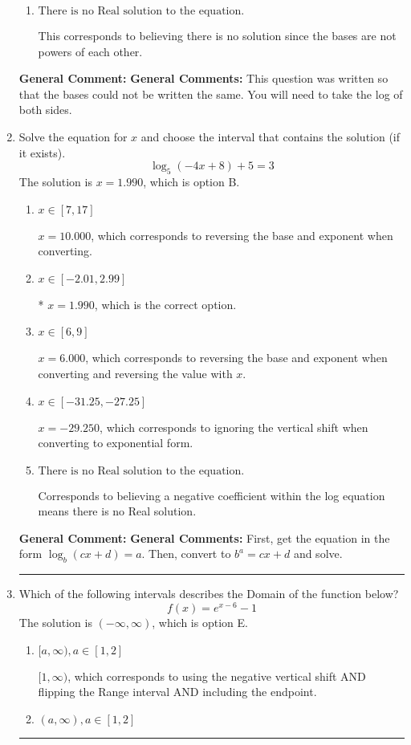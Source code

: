 \documentclass{extbook}[14pt]
\newcommand{\litem}[1]{\item #1

\rule{\textwidth}{0.4pt}}
\begin{document}
\begin{enumerate}
{\begin{enumerate}[label=\Alph*.]
* $x = 1.841$, which is the correct option.
\item \( \text{There is no Real solution to the equation.} \)

This corresponds to believing there is no solution since the bases are not powers of each other.
\end{enumerate}

\textbf{General Comment:} \textbf{General Comments:} This question was written so that the bases could not be written the same. You will need to take the log of both sides.
}
\litem{
Solve the equation for $x$ and choose the interval that contains the solution (if it exists).
\[ \log_{5}{(-4x+8)}+5 = 3 \]The solution is \( x = 1.990 \), which is option B.\begin{enumerate}[label=\Alph*.]
\item \( x \in [7, 17] \)

$x = 10.000$, which corresponds to reversing the base and exponent when converting.
\item \( x \in [-2.01, 2.99] \)

* $x = 1.990$, which is the correct option.
\item \( x \in [6, 9] \)

$x = 6.000$, which corresponds to reversing the base and exponent when converting and reversing the value with $x$.
\item \( x \in [-31.25, -27.25] \)

$x = -29.250$, which corresponds to ignoring the vertical shift when converting to exponential form.
\item \( \text{There is no Real solution to the equation.} \)

Corresponds to believing a negative coefficient within the log equation means there is no Real solution.
\end{enumerate}

\textbf{General Comment:} \textbf{General Comments:} First, get the equation in the form $\log_b{(cx+d)} = a$. Then, convert to $b^a = cx+d$ and solve.
}
\litem{
Which of the following intervals describes the Domain of the function below?
\[ f(x) = e^{x-6}-1 \]The solution is \( (-\infty, \infty) \), which is option E.\begin{enumerate}[label=\Alph*.]
\item \( [a, \infty), a \in [1, 2] \)

$[1, \infty)$, which corresponds to using the negative vertical shift AND flipping the Range interval AND including the endpoint.
\item \( (a, \infty), a \in [1, 2] \)


\end{enumerate}}
\end{enumerate}
\end{document}
